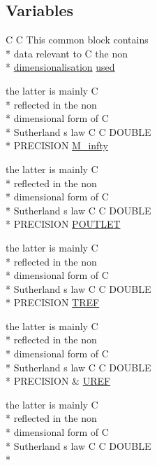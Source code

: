\subsection*{Variables}
\begin{DoxyCompactItemize}
\item 
C C This common block contains \\*
data relevant to C the non \\*
\hyperlink{ioplasma_8com_a400563a4c7d85c3c04db2d7e198c44a3}{dimensionalisation} \hyperlink{stream_8com_a3291a21585d0aec360cd82d75bf51496}{used}
\item 
the latter is mainly C \\*
reflected in the non \\*
dimensional form of C \\*
Sutherland s law C C D\-O\-U\-B\-L\-E \\*
P\-R\-E\-C\-I\-S\-I\-O\-N \hyperlink{stream_8com_a57c765efd76d44669f6966962bda2d72}{M\-\_\-infty}
\item 
the latter is mainly C \\*
reflected in the non \\*
dimensional form of C \\*
Sutherland s law C C D\-O\-U\-B\-L\-E \\*
P\-R\-E\-C\-I\-S\-I\-O\-N \hyperlink{stream_8com_a42c20c83e2242ab14c0d4178f49679c8}{P\-O\-U\-T\-L\-E\-T}
\item 
the latter is mainly C \\*
reflected in the non \\*
dimensional form of C \\*
Sutherland s law C C D\-O\-U\-B\-L\-E \\*
P\-R\-E\-C\-I\-S\-I\-O\-N \hyperlink{stream_8com_a8c4a60ca1b033fbd4e2cadaf15146ca5}{T\-R\-E\-F}
\item 
the latter is mainly C \\*
reflected in the non \\*
dimensional form of C \\*
Sutherland s law C C D\-O\-U\-B\-L\-E \\*
P\-R\-E\-C\-I\-S\-I\-O\-N \& \hyperlink{stream_8com_ab0954e3210109eba37b309fef6a66996}{U\-R\-E\-F}
\item 
the latter is mainly C \\*
reflected in the non \\*
dimensional form of C \\*
Sutherland s law C C D\-O\-U\-B\-L\-E \\*

\end{DoxyCompactItemize}
